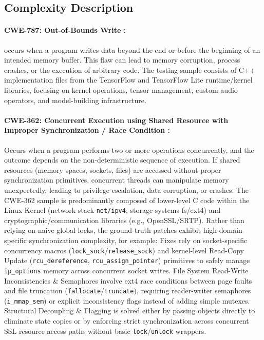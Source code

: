 \subsection{Complexity Description}
\paragraph{CWE-787: Out-of-Bounds Write :} occurs when a program writes data beyond the end or before the beginning of an intended memory buffer. 
This flaw can lead to memory corruption, process crashes, or the execution of arbitrary code. 
The testing sample consists of C++ implementation files from the TensorFlow and TensorFlow Lite runtime/kernel libraries, focusing on kernel operations, tensor management, custom audio operators, and model-building infrastructure.

\paragraph{CWE-362: Concurrent Execution using Shared Resource with Improper Synchronization / Race Condition :}Occurs when a program performs two or more operations concurrently, and the outcome depends on the non-deterministic sequence of execution. If shared resources (memory spaces, sockets, files) are accessed without proper synchronization primitives, concurrent threads can manipulate memory unexpectedly, leading to privilege escalation, data corruption, or crashes.
The CWE-362 sample is predominantly composed of lower-level C code within the Linux Kernel (network stack \texttt{net/ipv4}, storage systems fs/ext4) and cryptographic/communication libraries (e.g., OpenSSL/SRTP).
Rather than relying on naive global locks, the ground-truth patches exhibit high domain-specific synchronization complexity, for example:
Fixes rely on socket-specific concurrency macros (\texttt{lock\_sock}/\texttt{release\_sock}) and kernel-level Read-Copy Update (\texttt{rcu\_dereference}, \texttt{rcu\_assign\_pointer}) primitives to safely manage \texttt{ip\_options} memory across concurrent socket writes.
File System Read-Write Inconsistencies \& Semaphores involve ext4 race conditions between page faults and file truncation (\texttt{fallocate}/\texttt{truncate}), requiring reader-writer semaphores (\texttt{i\_mmap\_sem}) or explicit inconsistency flags instead of adding simple mutexes.
Structural Decoupling \& Flagging is solved either by passing objects directly to eliminate state copies or by enforcing strict synchronization across concurrent SSL resource access paths without basic \texttt{lock}/\texttt{unlock} wrappers.


